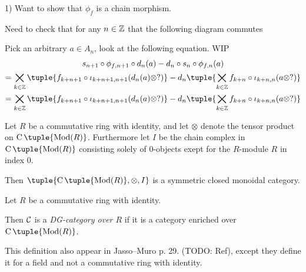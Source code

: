 \begin{remark}
    1) Want to show that \( \phi_f \) is a chain morphism.

    Need to check that for any \( n \in {\mathbb{Z}} \) that the following diagram commutes
    \begin{center}
    \end{center}
    Pick an arbitrary \( a \in A_n \), look at the following equation. WIP
    \begin{multline*}
        s_{n + 1} \circ \phi_{f, n + 1} \circ d_n(a) - d_n \circ s_n \circ \phi_{f, n}(a) \\
        = \bigtimes_{k \in \Zb} \tuple{ f_{k + n + 1} \circ \iota_{k + n + 1, n + 1} (d_n(a) \otimes ?) } - d_n \tuple{ \bigtimes_{k \in \Zb} f_{k + n} \circ \iota_{k + n, n} (a \otimes ?) } \\
        = \bigtimes_{k \in \Zb} \tuple{ f_{k + n + 1} \circ \iota_{k + n + 1, n + 1} (d_n(a) \otimes ?) } - d_n \tuple{ \bigtimes_{k \in \Zb} f_{k + n} \circ \iota_{k + n, n} (a \otimes ?) }
    \end{multline*}
\end{remark}

\begin{fact}
    Let \( R \) be a commutative ring with identity, and let \( \otimes \) denote the tensor product on \( \C \tuple{\Mod(R)} \). Furthermore let \( I \) be the chain complex in \( \C \tuple{\Mod(R)} \) consisting solely of \( 0 \)-objects exept for the \( R \)-module \( R \) in index \( 0 \).

    Then \( \tuple{\C \tuple{\Mod(R)}, \otimes, I} \) is a symmetric closed monoidal category.
\end{fact}

\begin{definition}[DG-category]
    Let \( R \) be a commutative ring with identity.

    Then \( {\mathcal{C}} \) is a \emph{DG-category over \( R \)} if it is a category enriched over \( \C \tuple{\Mod(R)} \).
\end{definition}
This definition also appear in Jasso--Muro p. 29. (TODO: Ref), except they define it for a field and not a commutative ring with identity.

